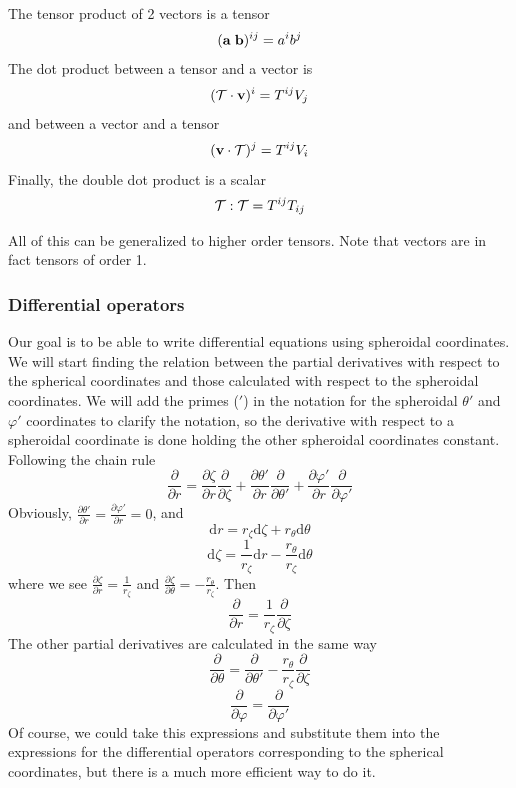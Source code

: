 The tensor product of 2 vectors is a tensor
\begin{equation}
(\mathbf{a}\;\mathbf{b})^{ij}=a^ib^j
\end{equation}
The dot product between a tensor and a vector is
\begin{equation}
(\mathcal{T}\cdot\mathbf{v})^i=T^{ij}V_j
\end{equation}
and between a vector and a tensor
\begin{equation}
(\mathbf{v}\cdot\mathcal{T})^j=T^{ij}V_i
\end{equation}
Finally, the double dot product is a scalar
\begin{equation}
\mathcal{T} : \mathcal{T}=T^{ij}T_{ij}
\end{equation}

All of this can be generalized to higher order tensors. Note that vectors are in fact tensors of order 1. 

\subsubsection{Differential operators}

Our goal is to be able to write differential equations using spheroidal coordinates. We will start
finding the relation between the partial derivatives with respect to the spherical coordinates and those
calculated with respect to the spheroidal coordinates. We will add the primes ($'$) in the notation for 
the spheroidal $\theta'$ and $\varphi'$ coordinates to clarify the notation, so the derivative with
respect to a spheroidal coordinate is done holding the other spheroidal coordinates constant.
Following the chain rule
\begin{equation}
\frac{\partial}{\partial r}=
\frac{\partial\zeta}{\partial r}\frac{\partial}{\partial \zeta}
+\frac{\partial\theta'}{\partial r}\frac{\partial}{\partial \theta'}
+\frac{\partial\varphi'}{\partial r}\frac{\partial}{\partial \varphi'}
\end{equation}
Obviously, $\displaystyle \frac{\partial\theta'}{\partial r}=\frac{\partial\varphi'}{\partial r}=0$, and
$$\mathrm{d}r=r_\zeta\mathrm{d}\zeta+r_\theta\mathrm{d}\theta$$
$$\mathrm{d}\zeta=\frac{1}{r_\zeta}\mathrm{d}r-\frac{r_\theta}{r_\zeta}\mathrm{d}\theta$$
where we see $\displaystyle \frac{\partial\zeta}{\partial r}=\frac{1}{r_\zeta}$
and $\displaystyle \frac{\partial\zeta}{\partial\theta}=-\frac{r_\theta}{r_\zeta}$. Then
\begin{equation}
\frac{\partial}{\partial r}=\frac{1}{r_\zeta}\frac{\partial}{\partial \zeta}
\end{equation}
The other partial derivatives are calculated in the same way
\begin{equation}
\frac{\partial}{\partial\theta}=\frac{\partial}{\partial \theta'}
-\frac{r_\theta}{r_\zeta}\frac{\partial}{\partial \zeta}
\end{equation}
\begin{equation}
\frac{\partial}{\partial \varphi}=\frac{\partial}{\partial \varphi'}
\end{equation}
Of course, we could take this expressions and substitute them into the expressions for the differential
operators corresponding to the spherical coordinates, but there is a much more efficient way to do it.

